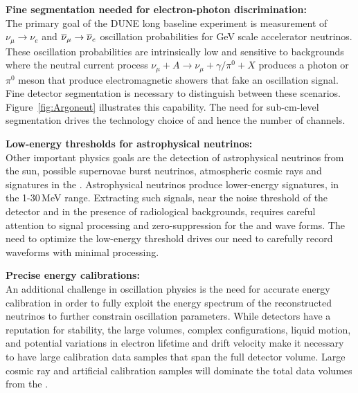 \documentclass[../main-v1.tex]{subfiles}
\begin{document}
\begin{description}
\item{\bf Fine segmentation needed for electron-photon discrimination: \\}   The primary goal of the DUNE long baseline experiment is measurement of $\nu_\mu\rightarrow\nu_e$ and $\overline{\nu}_\mu\rightarrow\overline{\nu}_e$
oscillation probabilities for GeV scale accelerator neutrinos.   These oscillation probabilities are intrinsically low and sensitive to backgrounds where the neutral current process  $\nu_\mu+A\rightarrow\nu_\mu+\gamma/\pi^0+X$
produces a photon or $\pi^0$ meson that produce electromagnetic showers that  %
fake an oscillation signal.  Fine detector segmentation is necessary to distinguish between these scenarios. Figure~\ref{fig:Argoneut} illustrates this capability. The need for sub-cm-level segmentation drives the technology choice of  and hence  %
the number of channels.   
\item{\bf Low-energy thresholds for astrophysical neutrinos: \\}
Other important physics goals are the detection of astrophysical neutrinos from the sun, possible supernovae burst neutrinos, atmospheric cosmic rays and %
 signatures in the .  Astrophysical neutrinos produce lower-energy signatures, in the 1-30\,MeV range. Extracting such signals, near the noise threshold of the detector and in the presence of radiological backgrounds, requires careful attention to signal processing and zero-suppression for the   and  wave forms.  The need to optimize the low-energy threshold drives our need to carefully record waveforms with minimal processing. 

\item{\bf Precise energy calibrations:\\}
An additional challenge in oscillation physics is the need for accurate energy calibration in order to fully %
exploit the energy spectrum of the reconstructed neutrinos to further constrain oscillation parameters. While  detectors have a reputation for stability, the large volumes, complex \efield configurations, liquid motion, and potential variations in electron lifetime and drift velocity make it necessary to have large calibration data samples that span the full  detector volume.  Large cosmic ray and artificial calibration samples will dominate the total data volumes from the . 


\end{description}
\end{document}
